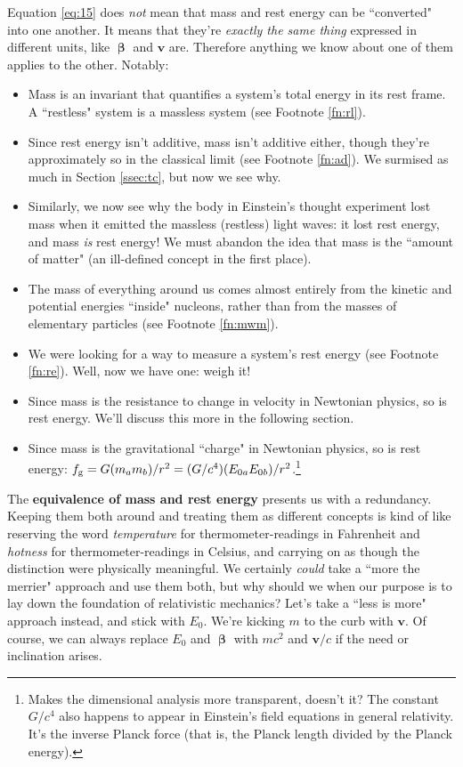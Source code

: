 \documentclass[12pt]{article}
\renewcommand{\vv}[1]{\mathbf{#1}}
\newcommand{\vvbeta}{\bm{\upbeta}}
\begin{document}
Equation \ref{eq:15} does \emph{not} mean that mass and rest energy can be ``converted" into one another. It means that they're \emph{exactly the same thing} expressed in different units, like $\vvbeta$ and $\vv v$ are. Therefore anything we know about one of them applies to the other. Notably:
\begin{itemize}
\item Mass is an invariant that quantifies a system's total energy in its rest frame. A ``restless" system is a massless system (see Footnote \ref{fn:rl}).
\item Since rest energy isn't additive, mass isn't additive either, though they're approximately so in the classical limit (see Footnote \ref{fn:ad}). We surmised as much in Section \ref{ssec:tc}, but now we see why.
\item Similarly, we now see why the body in Einstein's thought experiment lost mass when it emitted the massless (restless) light waves: it lost rest energy, and mass \emph{is} rest energy! We must abandon the idea that mass is the ``amount of matter" (an ill-defined concept in the first place).
\item The mass of everything around us comes almost entirely from the kinetic and potential energies ``inside" nucleons, rather than from the masses of elementary particles (see Footnote \ref{fn:mwm}).
\item We were looking for a way to measure a system's rest energy (see Footnote \ref{fn:re}). Well, now we have one: weigh it!
\item Since mass is the resistance to change in velocity in Newtonian physics, so is rest energy. We'll discuss this more in the following section.
\item Since mass is the gravitational ``charge" in Newtonian physics, so is rest energy: $f_{\mathrm{g}} = G(m_a m_b)/r^2 = (G/c^4)(E_{0 \mkern.5mu a} E_{0 \mkern.5mu b})/r^2$.\footnote{Makes the dimensional analysis more transparent, doesn't it? The constant $G / c^4$ also happens to appear in Einstein's field equations in general relativity. It's the inverse Planck force (that is, the Planck length divided by the Planck energy).}
\end{itemize}

The \textbf{equivalence of mass and rest energy} presents us with a redundancy. Keeping them both around and treating them as different concepts is kind of like reserving the word \emph{temperature} for thermometer-readings in Fahrenheit and \emph{hotness} for thermometer-readings in Celsius, and carrying on as though the distinction were physically meaningful. We certainly \emph{could} take a ``more the merrier" approach and use them both, but why should we when our purpose is to lay down the foundation of relativistic mechanics? Let's take a ``less is more" approach instead, and stick with $E_0$. We're kicking $m$ to the curb with $\vv v$. Of course, we can always replace $E_0$ and $\vvbeta$ with $mc^2$ and $\vv v/c$ if the need or inclination arises.
\end{document}
